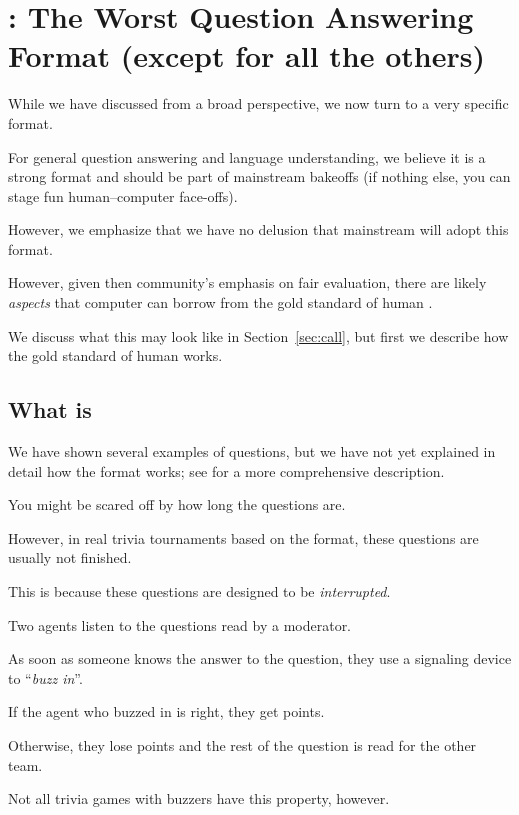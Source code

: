 

\section{\qb{}: The Worst Question Answering Format (except for all the others)}
\label{sec:qb}

While we have discussed \qa{} from a broad perspective, we now turn to a very specific format.

For general question answering and language understanding, we believe it is a strong format and should be part of mainstream  bakeoffs (if nothing else, you can stage fun human--computer face-offs).

However, we emphasize that we have no delusion that mainstream  will adopt this format.

However, given then community's emphasis on fair evaluation, there are likely \emph{aspects} that computer  can borrow from the gold standard of human .

We discuss what this may look like in Section~\ref{sec:call}, but first we describe how the gold standard of human  works.

\subsection{What is \qb{}}

We have shown several examples of \qb{} questions, but we have not yet explained in detail how the format works; see  for a more comprehensive description.

You might be scared off by how long the questions are.

However, in real trivia tournaments based on the \qb{} format, these questions are usually not finished.

This is because these questions are designed to be \emph{interrupted}.

Two agents listen to the questions read by a moderator.

As soon as someone knows the answer to the question, they use a signaling device to ``\emph{buzz in}''. 

If the agent who buzzed in is right, they get points.

Otherwise, they lose points and the rest of the question is read for the other team.  

Not all trivia games with buzzers have this property, however.


